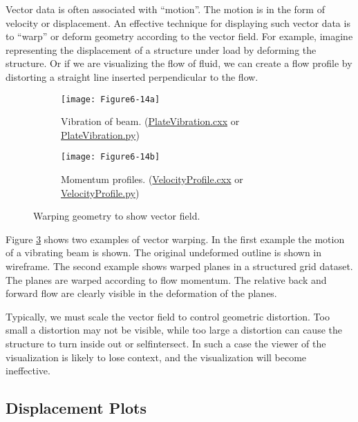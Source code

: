 Vector data is often associated with ``motion''. The motion is in the form of velocity or displacement. An effective technique for displaying such vector data is to ``warp'' or deform geometry according to the vector field. For example, imagine representing the displacement of a structure under load by deforming the structure. Or if we are visualizing the flow of fluid, we can create a flow profile by distorting a straight line inserted perpendicular to the flow.

\begin{figure}[htb]
	\begin{subfigure}[h]{0.48\linewidth}
	\texttt{[image: Figure6-14a]}
	\caption{Vibration of beam. (\href{https://lorensen.github.io/VTKExamples/site/Cxx/VisualizationAlgorithms/PlateVibration}{PlateVibration.cxx} or \href{https://lorensen.github.io/VTKExamples/site/Python/VisualizationAlgorithms/PlateVibration/}{PlateVibration.py})}\label{fig:Figure6-14a}
\end{subfigure}
	\hfill
	\begin{subfigure}[h]{0.48\linewidth}
		\texttt{[image: Figure6-14b]}
		\caption{Momentum profiles. (\href{https://lorensen.github.io/VTKExamples/site/Cxx/VisualizationAlgorithms/VelocityProfile}{VelocityProfile.cxx} or \href{https://lorensen.github.io/VTKExamples/site/Python/VisualizationAlgorithms/VelocityProfile/}{VelocityProfile.py})}\label{fig:Figure6-14b}
	\end{subfigure}
	\caption{Warping geometry to show vector field.}\label{fig:Figure6-14}
\end{figure}

Figure \ref{fig:Figure6-14} shows two examples of vector warping. In the first example the motion of a vibrating beam is shown. The original undeformed outline is shown in wireframe. The second example shows warped planes in a structured grid dataset. The planes are warped according to flow momentum. The relative back and forward flow are clearly visible in the deformation of the planes.

Typically, we must scale the vector field to control geometric distortion. Too small a distortion may not be visible, while too large a distortion can cause the structure to turn inside out or selfintersect. In such a case the viewer of the visualization is likely to lose context, and the visualization will become ineffective.

\subsection{Displacement Plots}

